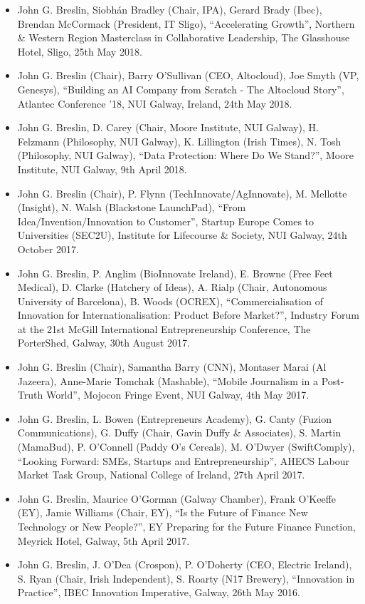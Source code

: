 \documentclass[10pt,a4paper]{res} %
\begin{document}
\begin{resume}
\begin{itemize}
\item John G. Breslin, Siobh\'{a}n Bradley (Chair, IPA), Gerard Brady (Ibec), Brendan McCormack (President, IT Sligo), ``Accelerating Growth'', Northern \& Western Region Masterclass in Collaborative Leadership, The Glasshouse Hotel, Sligo, 25th May 2018.
\item John G. Breslin (Chair), Barry O'Sullivan (CEO, Altocloud), Joe Smyth (VP, Genesys), ``Building an AI Company from Scratch - The Altocloud Story'', Atlantec Conference '18, NUI Galway, Ireland, 24th May 2018.
\item John G. Breslin, D. Carey (Chair, Moore Institute, NUI Galway), H. Felzmann (Philosophy, NUI Galway), K. Lillington (Irish Times), N. Tosh (Philosophy, NUI Galway), ``Data Protection: Where Do We Stand?'', Moore Institute, NUI Galway, 9th April 2018.
\item John G. Breslin (Chair), P. Flynn (TechInnovate/AgInnovate), M. Mellotte (Insight), N. Walsh (Blackstone LaunchPad), ``From Idea/Invention/Innovation to Customer'', Startup Europe Comes to Universities (SEC2U), Institute for Lifecourse \& Society, NUI Galway, 24th October 2017.
\item John G. Breslin, P. Anglim (BioInnovate Ireland), E. Browne (Free Feet Medical), D. Clarke (Hatchery of Ideas), A. Rialp (Chair, Autonomous University of Barcelona), B. Woods (OCREX), ``Commercialisation of Innovation for Internationalisation: Product Before Market?'', Industry Forum at the 21st McGill International Entrepreneurship Conference, The PorterShed, Galway, 30th August 2017.
\item John G. Breslin (Chair), Samantha Barry (CNN), Montaser Marai (Al Jazeera), Anne-Marie Tomchak (Mashable), ``Mobile Journalism in a Post-Truth World'', Mojocon Fringe Event, NUI Galway, 4th May 2017.
\item John G. Breslin, L. Bowen (Entrepreneurs Academy), G. Canty (Fuzion Communications), G. Duffy (Chair, Gavin Duffy \& Associates), S. Martin (MamaBud), P. O'Connell (Paddy O's Cereals), M. O'Dwyer (SwiftComply), ``Looking Forward: SMEs, Startups and Entrepreneurship'', AHECS Labour Market Task Group, National College of Ireland, 27th April 2017.
\item John G. Breslin, Maurice O'Gorman (Galway Chamber), Frank O'Keeffe (EY), Jamie Williams (Chair, EY), ``Is the Future of Finance New Technology or New People?'', EY Preparing for the Future Finance Function, Meyrick Hotel, Galway, 5th April 2017.
\item John G. Breslin, J. O'Dea (Crospon), P. O'Doherty (CEO, Electric Ireland), S. Ryan (Chair, Irish Independent), S. Roarty (N17 Brewery), ``Innovation in Practice'', IBEC Innovation Imperative, Galway, 26th May 2016.

\end{itemize}
\end{resume}
\end{document}
